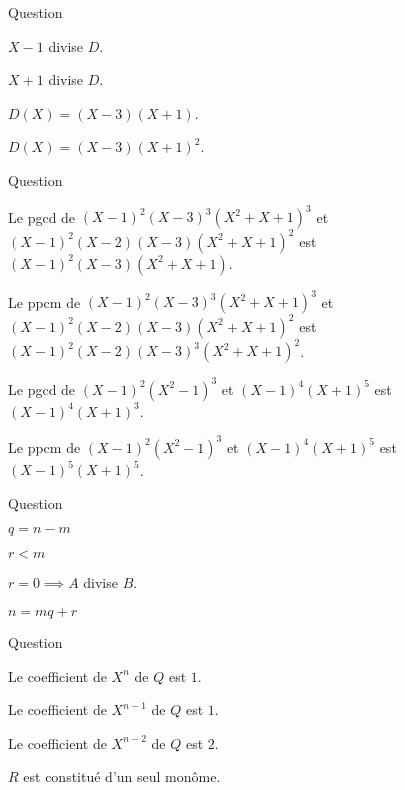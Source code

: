 \begin{multi}[multiple,feedback=
{\(A(X) = (X-3)(X+1)^2(X-1)\), \(B(X) = X^2(X-3)(X+1)\),
le pgcd est \(D = (X-3)(X+1)\). 
}]{Question}
    \item \(X-1\) divise \(D\).
    \item* \(X+1\) divise \(D\).
    \item* \(D(X) = (X-3)(X+1)\).
    \item \(D(X) = (X-3)(X+1)^2\).
\end{multi}


\begin{multi}[multiple,feedback=
{Le pgcd s'obtient en prenant le minimum entre les exposants, le ppcm en prenant le maximum. Attention \(X^2-1=(X-1)(X+1)\).
}]{Question}
    \item Le pgcd de \((X-1)^2(X-3)^3(X^2+X+1)^3\) et
\((X-1)^2(X-2)(X-3)(X^2+X+1)^2\) est \((X-1)^2(X-3)(X^2+X+1)\).
    \item Le ppcm de \((X-1)^2(X-3)^3(X^2+X+1)^3\) et
\((X-1)^2(X-2)(X-3)(X^2+X+1)^2\) est \((X-1)^2(X-2)(X-3)^3(X^2+X+1)^2\).
    \item* Le pgcd de \((X-1)^2(X^2-1)^3\) et
\((X-1)^4(X+1)^5\) est \((X-1)^4(X+1)^3\).
    \item* Le ppcm de \((X-1)^2(X^2-1)^3\) et
\((X-1)^4(X+1)^5\) est \((X-1)^5(X+1)^5\).
\end{multi}


\begin{multi}[multiple,feedback=
{On a \(\deg R < \deg B\). Il ne faut pas confondre \(R=0\) et \(r=0\).
En plus \(\deg(A) = \deg(B\times Q) = \deg(A) + \deg(Q)\).
}]{Question}
    \item* \(q = n-m\)
    \item* \(r < m\)
    \item \(r=0 \implies A\) divise \(B\).
    \item \(n = mq + r\)
\end{multi}


\begin{multi}[multiple,feedback=
{\(Q(X) = X^n-X^{n-1}+2X^{n-2}-2X^{n-3}+\cdots\). \(R(X) = \pm 2 X^{n-1}\).
}]{Question}
    \item* Le coefficient de \(X^n\) de \(Q\) est \(1\).
    \item Le coefficient de \(X^{n-1}\) de \(Q\) est \(1\).
    \item* Le coefficient de \(X^{n-2}\) de \(Q\) est \(2\).
    \item* \(R\) est constitué d'un seul monôme.
\end{multi}


